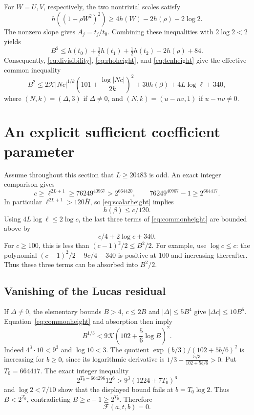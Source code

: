 \documentclass[11pt,a4paper]{article}
\begin{document}
For $W=U,V$, respectively, the two nontrivial scales satisfy
\[
 h((1+\rho W^2)^2)
       \ge4h(W)-2h(\rho)-2\log2.
\]
The nonzero slope gives $A_j=t_j/t_0$. Combining these inequalities
with $2\log2<2$ yields
\begin{equation}\label{eq:sumheight}
 B^2\le h(t_0)+\tfrac12h(t_1)+\tfrac12h(t_2)
                       +2h(\rho)+84.
\end{equation}
Consequently, \eqref{eq:divisibility}, \eqref{eq:rhoheight}, and
\eqref{eq:tenheight} give the effective common inequality
\begin{equation}\label{eq:commonheight}
 B^2\le2\mathcal K|Nc|^{1/k}
       \left(101+\frac{\log|Nc|}{2k}\right)^2
                      +30h(\beta)+4L\log\ell+340,
\end{equation}
where $(N,k)=(\Delta,3)$ if $\Delta\ne0$, and
$(N,k)=(u-nv,1)$ if $u-nv\ne0$.

\section{An explicit sufficient coefficient parameter}

Assume throughout this section that $L\ge20483$ is odd.
An exact integer comparison gives
\begin{equation}\label{eq:binaryforced}
 c\ge\ell^{2L+1}\ge76249^{40967}>2^{664420},
 \qquad 76249^{40967}-1\ge2^{664417}.
\end{equation}
In particular $\ell^{2L+1}>120\overline H$, so
\eqref{eq:scalarheight} implies
\begin{equation}\label{eq:scalarlinear}
                         h(\beta)\le c/120.
\end{equation}
Using $4L\log\ell\le2\log c$, the last three terms of
\eqref{eq:commonheight} are bounded above by
\[
                       c/4+2\log c+340.
\]
For $c\ge100$, this is less than $(c-1)^2/2\le B^2/2$.
For example, use $\log c\le c$: the polynomial
$(c-1)^2/2-9c/4-340$ is positive at $100$ and increasing thereafter.
Thus these three terms can be absorbed into $B^2/2$.

\subsection{Vanishing of the Lucas residual}

If $\Delta\ne0$, the elementary bounds $B>4$, $c\le2B$ and
$|\Delta|\le5B^4$ give $|\Delta c|\le10B^5$.
Equation~\eqref{eq:commonheight} and absorption then imply
\[
 B^{1/3}<9\mathcal K\left(102+\frac56\log B\right)^2.
\]
Indeed $4^3\cdot10<9^3$ and $\log10<3$. The quotient
$\exp(b/3)/(102+5b/6)^2$ is increasing for $b\ge0$, since its
logarithmic derivative is $1/3-\frac{5/3}{102+5b/6}>0$.
Put $T_0=664417$. The exact integer inequality
\[
 2^{T_0-664296}12^6>9^3(1224+7T_0)^6
\]
and $\log2<7/10$ show that the displayed bound fails at
$b=T_0\log2$. Thus $B<2^{T_0}$, contradicting
$B\ge c-1\ge2^{T_0}$. Therefore
\begin{equation}\label{eq:Delta0}
                              \mathcal F(a,t,b)=0.
\end{equation}
\end{document}
